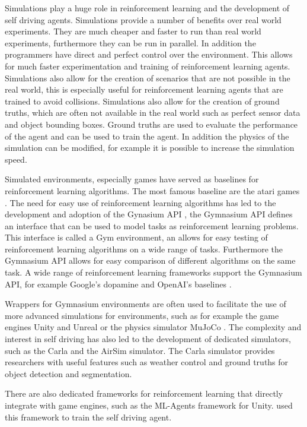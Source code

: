 Simulations play a huge role in reinforcement learning and the development of self driving agents. Simulations provide a number of benefits over real world experiments. They are much cheaper and faster to run than real world experiments, furthermore they can be run in parallel. In addition the programmers have direct and perfect control over the environment. This allows for much faster experimentation and training of reinforcement learning agents. Simulations also allow for the creation of scenarios that are not possible in the real world, this is especially useful for reinforcement learning agents that are trained to avoid collisions. Simulations also allow for the creation of ground truths, which are often not available in the real world such as perfect sensor data and object bounding boxes. Ground truths are used to evaluate the performance of the agent and can be used to train the agent. In addition the physics of the simulation can be modified, for example it is possible to increase the simulation speed.

Simulated environments, especially games have served as baselines for reinforcement learning algorithms. The most famous baseline are the atari games \autocite{atari}. The need for easy use of reinforcement learning algorithms has led to the development and adoption of the Gynasium API \autocite{gymnasium}, the Gymnasium API defines an interface that can be used to model tasks as reinforcement learning problems. This interface is called a Gym environment, an allows for easy testing of reinforcement learning algorithms on a wide range of tasks. Furthermore the Gymnasium API allows for easy comparison of different algorithms on the same task. A wide range of reinforcement learning frameworks support the Gymnasium API, for example Google's dopamine \autocite{dopamine} and OpenAI's baselines \autocite{sb3}.

Wrappers for Gymnasium environments are often used to facilitate the use of more advanced simulations for environments, such as for example the game engines Unity and Unreal or the physics simulator MuJoCo \autocite{mujoco}. The complexity and interest in self driving has also led to the development of dedicated simulators, such as the Carla \autocite{carla} and the AirSim \autocite{airsim} simulator. The Carla simulator provides researchers with useful features such as weather control and ground truths for object detection and segmentation.

There are also dedicated frameworks for reinforcement learning that directly integrate with game engines, such as the ML-Agents framework \autocite{mlagents} for Unity.\autocite{maximilian} used this framework to train the self driving agent.

